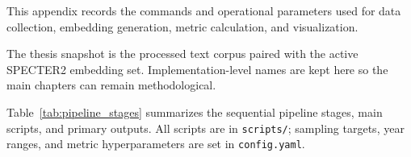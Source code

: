 
\noindent This appendix records the commands and operational parameters used for data collection, embedding generation, metric calculation, and visualization.

\medskip

The thesis snapshot is the processed text corpus paired with the active SPECTER2 embedding set. Implementation-level names are kept here so the main chapters can remain methodological.

\medskip

Table~\ref{tab:pipeline_stages} summarizes the sequential pipeline stages, main scripts, and primary outputs. All scripts are in \texttt{scripts/}; sampling targets, year ranges, and metric hyperparameters are set in \texttt{config.yaml}.

